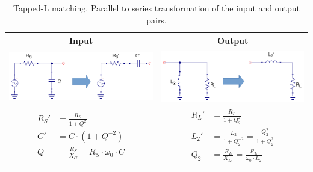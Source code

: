 \begin{table}[H]
  \centering
  \begin{tabular}{ | c | c | }
    \hline
    Input & Output\\ \hline
    \begin{minipage}{.4\textwidth}
      \includegraphics[width=\linewidth]{./images/Synthesis/Impedance_Matching/Tapped-L-transformation-input}
    \end{minipage}
    &
    \begin{minipage}{.4\textwidth}
      \includegraphics[width=\linewidth]{./images/Synthesis/Impedance_Matching/Tapped-L-transformation-output}
    \end{minipage}
\\ \hline
    \begin{minipage}{.4\textwidth}
         {\begin{align}
           R_S' &= \frac{R_S}{1 + Q^2}\\
           C' &= C \cdot (1+Q^{-2})\\
           Q &= \frac{R_S}{X_C} = R_S \cdot \omega_0 \cdot C
         \end{align}}
    \end{minipage}
    &
        \begin{minipage}{.4\textwidth}
         {\begin{align}
           R_L' &= \frac{R_L}{1 + Q_2^2}\\
           L_2' &= \frac{L_2}{1 + Q_2^{-2}} = \frac{Q_2^2}{1 + Q_2^2}\\
           Q_2 &= \frac{R_L}{X_{L_2}} = \frac{R_L}{\omega_0 \cdot L_2}
         \end{align}}
    \end{minipage}
    \\ \hline
  \end{tabular}
  \caption{Tapped-L matching. Parallel to series transformation of the input and output pairs.}
  \label{tbl:tapped-L-matching}
\end{table}

